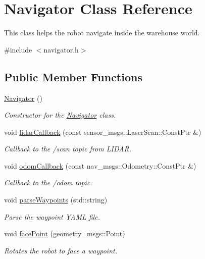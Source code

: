 \hypertarget{class_navigator}{}\section{Navigator Class Reference}
\label{class_navigator}


This class helps the robot navigate inside the warehouse world.  




{\ttfamily \#include $<$navigator.\+h$>$}

\subsection*{Public Member Functions}
\begin{DoxyCompactItemize}
\item 
\hyperlink{class_navigator_a59230ab4698882f754d5ce275a1a4030}{Navigator} ()
\begin{DoxyCompactList}\small\item\em Constructor for the \hyperlink{class_navigator}{Navigator} class. \end{DoxyCompactList}\item 
void \hyperlink{class_navigator_aacf40aee867f32fd7ebd217323bbae45}{lidar\+Callback} (const sensor\+\_\+msgs\+::\+Laser\+Scan\+::\+Const\+Ptr \&)
\begin{DoxyCompactList}\small\item\em Callback to the /scan topic from L\+I\+D\+AR. \end{DoxyCompactList}\item 
void \hyperlink{class_navigator_ae9af300677161b9112dcfcb2bdb818e2}{odom\+Callback} (const nav\+\_\+msgs\+::\+Odometry\+::\+Const\+Ptr \&)
\begin{DoxyCompactList}\small\item\em Callback to the /odom topic. \end{DoxyCompactList}\item 
void \hyperlink{class_navigator_a6580377e81d1bcbedf06526c07ab5951}{parse\+Waypoints} (std\+::string)
\begin{DoxyCompactList}\small\item\em Parse the waypoint Y\+A\+ML file. \end{DoxyCompactList}\item 
void \hyperlink{class_navigator_a6dcff036582b164e328baa45f8e567c4}{face\+Point} (geometry\+\_\+msgs\+::\+Point)
\begin{DoxyCompactList}\small\item\em Rotates the robot to face a waypoint. \end{DoxyCompactList}\item 

\end{DoxyCompactItemize}
